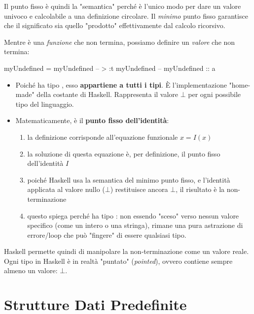 Il punto fisso è quindi la "semantica" perché è l'unico modo per dare un valore univoco e calcolabile a una definizione circolare. Il \textit{minimo} punto fisso garantisce che il significato sia quello "prodotto" effettivamente dal calcolo ricorsivo.

\begin{gframe}{}
Mentre  è una \textit{funzione} che non termina, possiamo definire un \textit{valore} che non termina:
\begin{haskellbox}{}
myUndefined = myUndefined
-- > :t myUndefined
-- myUndefined :: a
\end{haskellbox}

\begin{itemize}
    \item  Poiché  ha tipo , esso \textbf{appartiene a tutti i tipi}. È l'implementazione "home-made" della costante  di Haskell. Rappresenta il valore $\bot$ per ogni possibile tipo del linguaggio.
    \item Matematicamente,  è il \textbf{punto fisso dell'identità}: 
\begin{enumerate}
\item la definizione  corrisponde all'equazione funzionale $x = I(x)$
\item la soluzione di questa equazione è, per definizione, il punto fisso dell'identità $I$
\item poiché Haskell usa la semantica del minimo punto fisso, e l'identità applicata al valore nullo ($\bot$) restituisce ancora $\bot$, il risultato è la non-terminazione
\item questo spiega perché  ha tipo : non essendo "sceso" verso nessun valore specifico (come un intero o una stringa), rimane una pura astrazione di errore/loop che può "fingere" di essere qualsiasi tipo.
\end{enumerate}
\end{itemize}

Haskell permette quindi di manipolare la non-terminazione come un valore reale. Ogni tipo in Haskell è in realtà "puntato" (\textit{pointed}), ovvero contiene sempre almeno un valore: $\bot$.
\end{gframe}

\section{Strutture Dati Predefinite}

